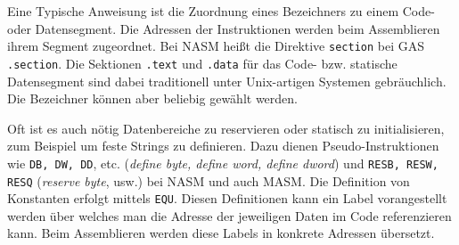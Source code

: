 Eine Typische Anweisung ist die Zuordnung eines Bezeichners zu einem Code- oder
Datensegment. Die Adressen der Instruktionen werden beim Assemblieren ihrem
Segment zugeordnet. Bei NASM heißt die Direktive \texttt{section}
bei GAS \texttt{.section}. Die Sektionen \texttt{.text} und
\texttt{.data} für das Code- bzw. statische Datensegment sind dabei traditionell
unter Unix-artigen Systemen gebräuchlich. Die Bezeichner können aber 
beliebig gewählt werden.

Oft ist es auch nötig Datenbereiche zu reservieren oder statisch zu
initialisieren, zum Beispiel um feste Strings zu definieren. Dazu dienen
Pseudo-Instruktionen wie \texttt{DB, DW, DD}, etc. (\emph{define byte, define
word, define dword}) und \texttt{RESB, RESW, RESQ} (\emph{reserve byte}, usw.)
bei NASM und auch MASM. Die Definition von Konstanten erfolgt mittels
\texttt{EQU}. Diesen Definitionen kann ein Label vorangestellt werden über
welches man die Adresse der jeweiligen Daten im Code referenzieren kann. Beim
Assemblieren werden diese Labels in konkrete Adressen übersetzt.


